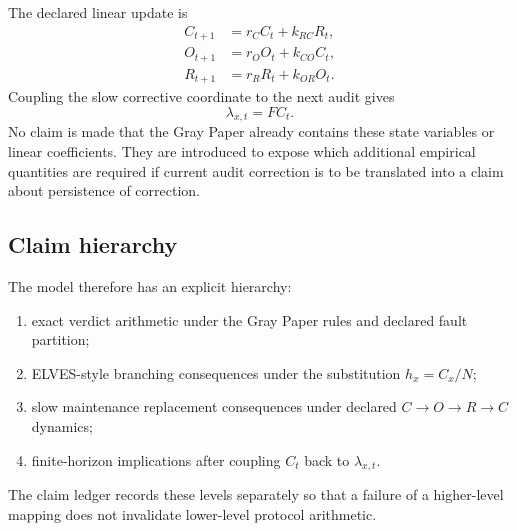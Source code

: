 The declared linear update is
\begin{align}
C_{t+1}&=r_C C_t+k_{RC}R_t,\\
O_{t+1}&=r_O O_t+k_{CO}C_t,\\
R_{t+1}&=r_R R_t+k_{OR}O_t.
\end{align}
Coupling the slow corrective coordinate to the next audit gives
\[
\lambda_{x,t}=F C_t.
\]
No claim is made that the Gray Paper already contains these state variables or linear coefficients. They are introduced to expose which additional empirical quantities are required if current audit correction is to be translated into a claim about persistence of correction.

\subsection{Claim hierarchy}

The model therefore has an explicit hierarchy:
\begin{enumerate}[leftmargin=*]
\item exact verdict arithmetic under the Gray Paper rules and declared fault partition;
\item ELVES-style branching consequences under the substitution $h_x=C_x/N$;
\item slow maintenance replacement consequences under declared $C\to O\to R\to C$ dynamics;
\item finite-horizon implications after coupling $C_t$ back to $\lambda_{x,t}$.
\end{enumerate}
The claim ledger records these levels separately so that a failure of a higher-level mapping does not invalidate lower-level protocol arithmetic.
